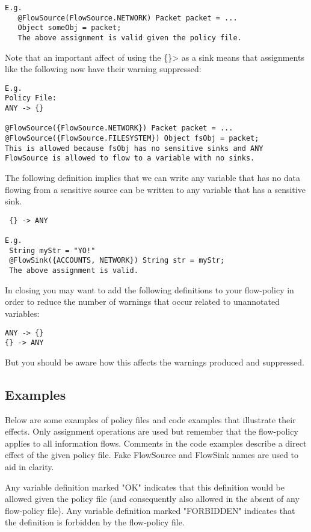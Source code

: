 \begin{Verbatim}
E.g.
   @FlowSource(FlowSource.NETWORK) Packet packet = ...
   Object someObj = packet;
   The above assignment is valid given the policy file.
\end{Verbatim}

Note that an important affect of using the \<\{\}> as a sink means
that assignments like the following now have their warning
suppressed:

\begin{Verbatim}
E.g.
Policy File:
ANY -> {}

@FlowSource({FlowSource.NETWORK}) Packet packet = ...
@FlowSource({FlowSource.FILESYSTEM}) Object fsObj = packet;
This is allowed because fsObj has no sensitive sinks and ANY FlowSource is allowed to flow to a variable with no sinks.
\end{Verbatim}

The following definition implies that we can write
any variable that has no data flowing from a
sensitive source can be written to any variable that
has a sensitive sink.
\begin{Verbatim}
 {} -> ANY

E.g.
 String myStr = "YO!"
 @FlowSink({ACCOUNTS, NETWORK}) String str = myStr;
 The above assignment is valid.
\end{Verbatim}

In closing you may want to add the following definitions
to your flow-policy in order to reduce the number of
warnings that occur related to unannotated variables:
\begin{Verbatim}
ANY -> {}
{} -> ANY
\end{Verbatim}

But you should be aware how this affects the
warnings produced and suppressed.

\subsection{Examples}

Below are some examples of policy files and code examples that
illustrate their effects.  Only assignment operations are used
but remember that the flow-policy applies to all information flows.
Comments in the code examples describe a direct effect of the
given policy file.  Fake FlowSource and FlowSink names are used
to aid in clarity.

Any variable definition marked "OK" indicates that this
definition would  be allowed given the policy file
(and consequently also allowed in the absent of any flow-policy
file).  Any variable definition marked "FORBIDDEN" indicates that
the definition is forbidden by the flow-policy file.


